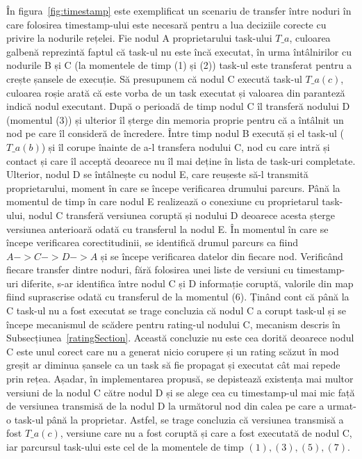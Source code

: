 \documentclass[12pt,a4paper]{report}
\begin{document}
În figura~\ref{fig:timestamp} este exemplificat un scenariu de transfer între noduri în care folosirea timestamp-ului este necesară pentru a lua deciziile corecte cu privire la nodurile rețelei. Fie nodul A proprietarului task-ului \textit{$T\_a$}, culoarea galbenă reprezintă faptul că task-ul nu este încă executat, în urma întâlnirilor cu nodurile B și C (la momentele de timp (1) și (2)) task-ul este transferat pentru a crește șansele de execuție. Să presupunem că nodul C execută task-ul \textit{$T\_a(c)$}, culoarea roșie arată că este vorba de un task executat și valoarea din paranteză indică nodul executant. După o perioadă de timp nodul C îl transferă nodului D (momentul (3)) și ulterior îl șterge din memoria proprie pentru că a întâlnit un nod pe care îl consideră de încredere. Între timp nodul B execută și el task-ul (\textit{$T\_a(b)$}) și îl corupe înainte de a-l transfera nodului C, nod cu care intră și contact și care îl acceptă deoarece nu îl mai deține în lista de task-uri completate. Ulterior, nodul D se întâlnește cu nodul E, care reușeste să-l transmită proprietarului, moment în care se începe verificarea drumului parcurs. Până la momentul de timp în care nodul E realizează o conexiune cu proprietarul task-ului, nodul C transferă versiunea coruptă și nodului D deoarece acesta șterge versiunea anterioară odată cu transferul la nodul E. În momentul în care se începe verificarea corectitudinii, se identifică drumul parcurs ca fiind $A->C->D->A$ și se începe verificarea datelor din fiecare nod. Verificând fiecare transfer dintre noduri, fără folosirea unei liste de versiuni cu timestamp-uri diferite, s-ar identifica între nodul C și D informație coruptă, valorile din map fiind suprascrise odată cu transferul de la momentul (6). Ținând cont că până la C task-ul nu a fost executat se trage concluzia că nodul C a corupt task-ul și se începe mecanismul de scădere pentru rating-ul nodului C, mecanism descris în Subsecțiunea~\ref{ratingSection}. Această concluzie nu este cea dorită deoarece nodul C este unul corect care nu a generat nicio corupere și un rating scăzut în mod greșit ar diminua șansele ca un task să fie propagat și executat cât mai repede prin rețea. Așadar, în implementarea propusă, se depistează existența mai multor versiuni de la nodul C către nodul D și se alege cea cu timestamp-ul mai mic față de versiunea transmisă de la nodul D la următorul nod din calea pe care a urmat-o task-ul până la proprietar. Astfel, se trage concluzia că versiunea transmisă a fost $T\_a(c)$, versiune care nu a fost coruptă și care a fost executată de nodul C, iar parcursul task-ului este cel de la momentele de timp ${(1),(3),(5),(7)}$.
\end{document}
